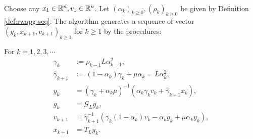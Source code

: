\documentclass[12pt]{article}
\begin{document}
        \begin{definition}\label{def:wapg}\;\\
            Choose any $x_1 \in \mathbb R^n, v_1 \in \mathbb R^n$. 
            Let $(\alpha_k)_{k \ge0}, (\rho_k)_{k \ge 0}$ be given by Definition \ref{def:rwapg-seq}. 
            The algorithm generates a sequence of vector $(y_k, x_{k + 1}, v_{k + 1})_{k \ge 1}$ for $k\ge 1$ by the procedures:  
            \begin{tcolorbox}
                For $k=1, 2, 3, \cdots$
                \begin{align*}
                    \gamma_k &:= \rho_{k -1}L\alpha_{k - 1}^2, 
                    \\
                    \hat \gamma_{k + 1} & := (1 - \alpha_k)\gamma_k + \mu \alpha_k = L\alpha_k^2, 
                    \\
                    y_k &= 
                    (\gamma_k + \alpha_k \mu)^{-1}(\alpha_k \gamma_k v_k + \hat\gamma_{k + 1} x_k), 
                    \\
                    g_k &= \mathcal G_L y_k, 
                    \\
                    v_{k + 1} &= 
                    \hat\gamma^{-1}_{k + 1}
                    (\gamma_k(1 - \alpha_k) v_k - \alpha_k g_k + \mu \alpha_k y_k), 
                    \\
                    x_{k + 1} &= T_L y_k. 
                \end{align*}    
            \end{tcolorbox}
        \end{definition}
\end{document}
